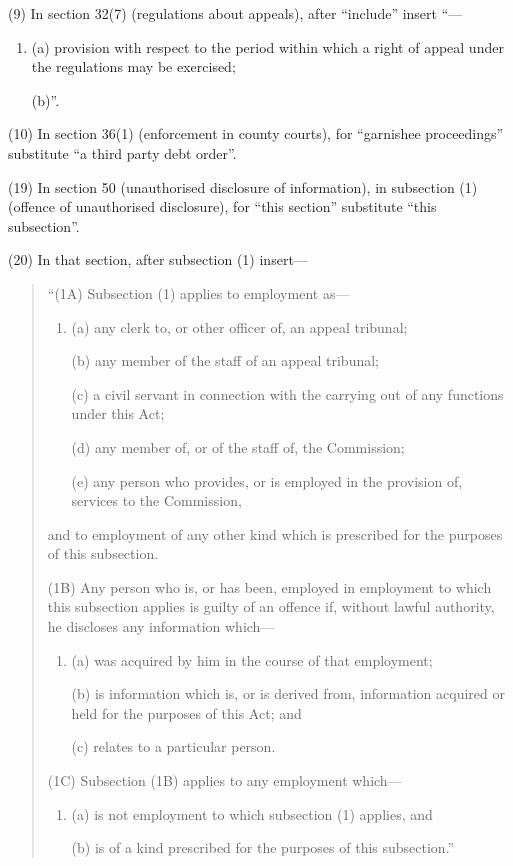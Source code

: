 \documentclass[a4paper]{article}
\begin{document}
(9) In section 32(7) (regulations about appeals), after “include” insert “—
\begin{enumerate}\item[]
 (a) provision with respect to the period within which a right of appeal under the regulations may be exercised;

(b)”.
\end{enumerate}

(10) In section 36(1) (enforcement in county courts), for “garnishee proceedings” substitute “a third party debt order”.

(19) In section 50 (unauthorised disclosure of information), in subsection (1) (offence of unauthorised disclosure), for “this section” substitute “this subsection”.

(20) In that section, after subsection (1) insert—
\begin{quotation}
“(1A) Subsection (1) applies to employment as—
\begin{enumerate}\item[]
(a) any clerk to, or other officer of, an appeal tribunal;

(b) any member of the staff of an appeal tribunal;

(c) a civil servant in connection with the carrying out of any functions under this Act;

(d) any member of, or of the staff of, the Commission;

(e) any person who provides, or is employed in the provision of, services to the Commission,
\end{enumerate}
and to employment of any other kind which is prescribed for the purposes of this subsection.

(1B) Any person who is, or has been, employed in employment to which this subsection applies is guilty of an offence if, without lawful authority, he discloses any information which—
\begin{enumerate}\item[]
(a) was acquired by him in the course of that employment;

(b) is information which is, or is derived from, information acquired or held for the purposes of this Act; and

(c) relates to a particular person.
\end{enumerate}

(1C) Subsection (1B) applies to any employment which—
\begin{enumerate}\item[]
(a) is not employment to which subsection (1) applies, and

(b) is of a kind prescribed for the purposes of this subsection.”
\end{enumerate}
\end{quotation}
\end{document}
